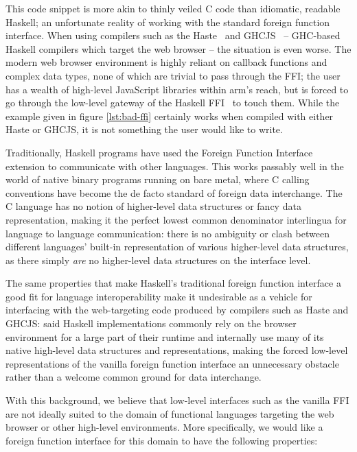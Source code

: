 \documentclass{sigplanconf}
\begin{document}
This code snippet is more akin to thinly veiled C code than idiomatic, readable
Haskell; an unfortunate reality of working with the standard foreign function
interface. When using compilers such as the Haste\ \cite{haste} and
GHCJS\ \cite{ghcjs} -- GHC-based Haskell compilers which target the web
browser -- the situation is even worse.
The modern web browser environment is highly reliant on callback functions and
complex data types, none of which are trivial to pass through the FFI;
the user has a wealth of high-level JavaScript libraries within arm's reach,
but is forced to go through the low-level gateway of
the Haskell FFI\ \cite{ffi} to touch them.
While the example given in figure \ref{lst:bad-ffi} certainly works when
compiled with either Haste or GHCJS, it is not something the user would like
to write.

Traditionally, Haskell programs have used the Foreign Function Interface
extension to communicate with other languages. This works
passably well in the world of native binary programs running on bare metal,
where C calling conventions have become the de facto standard of foreign
data interchange.
The C language has no notion of higher-level data structures or
fancy data representation, making it the perfect lowest common denominator
interlingua for language to language communication:
there is no ambiguity or clash between different languages' built-in
representation of various higher-level data structures, as there simply
\emph{are} no higher-level data structures on the interface level.

The same properties that make Haskell's traditional foreign function interface
a good fit for language interoperability make it undesirable as a vehicle for
interfacing with the web-targeting code produced by compilers such as Haste
and GHCJS: said Haskell implementations commonly rely on the browser environment
for a large part of their runtime and internally use many of its native
high-level data structures and representations, making the forced low-level
representations of the vanilla foreign function interface an unnecessary
obstacle rather than a welcome common ground for data interchange.

With this background, we believe that low-level interfaces such as the
vanilla FFI are not ideally suited to the domain of functional languages
targeting the web browser or other high-level environments.
More specifically, we would like a foreign function interface for this domain
to have the following properties:
\end{document}
